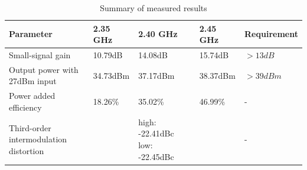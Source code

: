   \begin{table}[H]
	  \centering
	  \begin{tabular}{p{4.5cm} | p{1.7cm} p{2.7cm} p{1.7cm} l}
		  Parameter & 2.35 GHz & 2.40 GHz & 2.45 GHz & Requirement \\
		  \hline
		  Small-signal gain & 10.79dB & 14.08dB & 15.74dB & $>13dB$ \\
		  Output power with 27dBm input & 34.73dBm & 37.17dBm & 38.37dBm & $>39dBm$ \\
		  Power added efficiency & 18.26\% & 35.02\% & 46.99\% & - \\
		  Third-order intermodulation distortion & & high: -22.41dBc low: -22.45dBc & & - \\
	  \end{tabular}
	  \caption{Summary of measured results}
	  \label{tab:Meas_Sum}
  \end{table}


    
